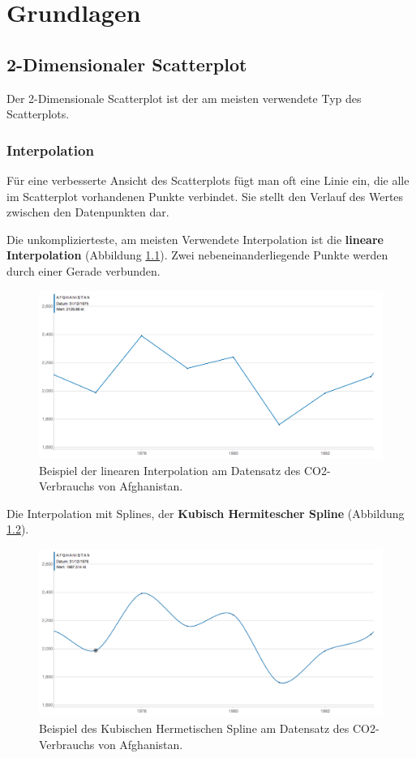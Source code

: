 \chapter{Grundlagen}

\section{2-Dimensionaler Scatterplot}
Der 2-Dimensionale Scatterplot ist der am meisten verwendete Typ des Scatterplots.

\subsection{Interpolation}
Für eine verbesserte Ansicht des Scatterplots fügt man oft eine Linie ein, die alle im Scatterplot vorhandenen Punkte verbindet. Sie stellt den Verlauf des Wertes zwischen den Datenpunkten dar.

Die unkomplizierteste, am meisten Verwendete Interpolation ist die \textbf{lineare Interpolation} (Abbildung \ref{fig:linear}). Zwei nebeneinanderliegende Punkte werden durch einer Gerade verbunden.

\begin{figure}[htbp]
	\centering
	\includegraphics[width=0.80\linewidth]{images/linear}
	\caption[Lineare Interpolation]{Beispiel der linearen Interpolation am Datensatz des CO2-Verbrauchs von Afghanistan.}
	\label{fig:linear}
\end{figure}

Die Interpolation mit Splines, der \textbf{Kubisch Hermitescher Spline} (Abbildung \ref{fig:cardinal}).

\begin{figure}[htbp]
	\centering
	\includegraphics[width=0.80\linewidth]{images/cardinal}
	\caption[Kubischer Hermitescher Spline]{Beispiel des Kubischen Hermetischen Spline am Datensatz des CO2-Verbrauchs von Afghanistan.}
	\label{fig:cardinal}
\end{figure}


